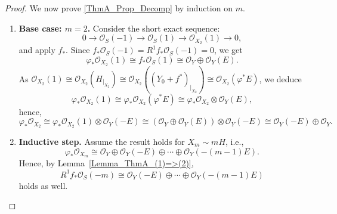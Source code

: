 \documentclass[a4paper,12pt]{amsart}
\begin{document}
\begin{proof}
We now prove \eqref{ThmA_Prop_Decomp} by induction on $m$.

\begin{enumerate}[label=(\arabic*), leftmargin=*, font=\rmfamily]
\item \textbf{Base case: $m = 2$.}
Consider the short exact sequence:
\[
  0 \to \mathcal{O}_S (-1)  \to \mathcal{O}_S (1) \to \mathcal{O}_{X_2} (1) \to 0 ,
\]
and apply $f_{\ast}$. Since $f_{\ast}\mathcal{O}_S (-1) = R^1 f_{\ast} \mathcal{O}_S (-1) = 0$, we get
\[
 \varphi_{\ast} \mathcal{O}_{X_2} (1) \cong f_{\ast} \mathcal{O}_S (1) \cong \mathcal{O}_Y \oplus \mathcal{O}_Y (E) .
\]
As $\mathcal{O}_{X_2} (1) \cong \mathcal{O}_{X_2} (H_{|_{X_2}}) \cong \mathcal{O}_{X_2} ((Y_0 + f^{\ast})_{|_{X_2}}) \cong \mathcal{O}_{X_2} (\varphi^{\ast} E)$, we deduce
\[
 \varphi_{\ast} \mathcal{O}_{X_2} (1) \cong \varphi_{\ast} \mathcal{O}_{X_2} (\varphi^{\ast} E) \cong \varphi_{\ast} \mathcal{O}_{X_2} \otimes \mathcal{O}_Y (E) ,
\]
hence,
\[
 \varphi_{\ast} \mathcal{O}_{X_2} \cong \varphi_{\ast} \mathcal{O}_{X_2} (1) \otimes \mathcal{O}_Y (-E) \cong \left( \mathcal{O}_Y \oplus \mathcal{O}_Y (E) \right) \otimes \mathcal{O}_Y (-E) \cong \mathcal{O}_Y (-E) \oplus \mathcal{O}_Y .
\]

 \item \textbf{Inductive step.} Assume the result holds for $X_m \sim mH$, i.e.,
  \[
   \varphi_{\ast} \mathcal{O}_{X_m} \cong \mathcal{O}_Y \oplus \mathcal{O}_Y (-E)  \oplus \cdots \oplus \mathcal{O}_Y (-(m-1)E) .
  \]
  Hence, by Lemma~\ref{Lemma_ThmA_(1)=>(2)},
\[
  R^1 f_{\ast} \mathcal{O}_S (-m) \cong \mathcal{O}_Y (-E) \oplus \cdots \oplus \mathcal{O}_Y (-(m-1)E)
\]
holds as well.



\end{enumerate}
\end{proof}
\end{document}
